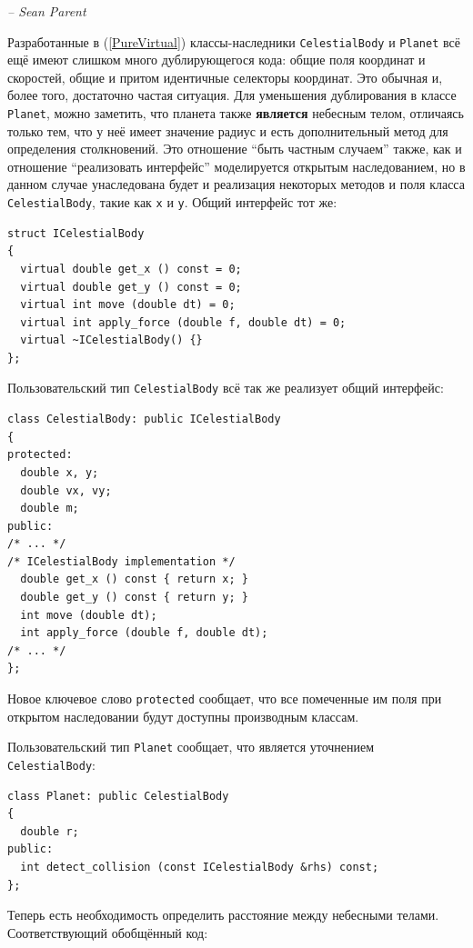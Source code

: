 \documentclass[a4paper,12pt,oneside]{article}
\begin{document}
\hfill\textit{-- Sean Parent}

Разработанные в (\ref{PureVirtual}) классы-наследники \lstinline!CelestialBody! и \lstinline!Planet! всё ещё имеют слишком много дублирующегося кода: общие поля координат и скоростей, общие и притом идентичные селекторы координат. Это обычная и, более того, достаточно частая ситуация. Для уменьшения дублирования в классе \lstinline!Planet!, можно заметить, что планета также \textbf{является} небесным телом, отличаясь только тем, что у неё имеет значение радиус и есть дополнительный метод для определения столкновений. Это отношение ``быть частным случаем'' также, как и отношение ``реализовать интерфейс'' моделируется открытым наследованием, но в данном случае унаследована будет и реализация некоторых методов и поля класса \lstinline!CelestialBody!, такие как \lstinline!x! и \lstinline!y!. Общий интерфейс тот же:

\begin{lstlisting}
struct ICelestialBody
{
  virtual double get_x () const = 0;
  virtual double get_y () const = 0;
  virtual int move (double dt) = 0;
  virtual int apply_force (double f, double dt) = 0;
  virtual ~ICelestialBody() {}
};
\end{lstlisting}

Пользовательский тип \lstinline!CelestialBody! всё так же реализует общий интерфейс:

\begin{lstlisting}
class CelestialBody: public ICelestialBody
{
protected:
  double x, y;
  double vx, vy;
  double m;
public:
/* ... */
/* ICelestialBody implementation */
  double get_x () const { return x; }
  double get_y () const { return y; }
  int move (double dt); 
  int apply_force (double f, double dt);
/* ... */
};
\end{lstlisting}

Новое ключевое слово \lstinline!protected! сообщает, что все помеченные им поля при открытом наследовании будут доступны производным классам.

Пользовательский тип \lstinline!Planet! сообщает, что является уточнением \lstinline!CelestialBody!:

\begin{lstlisting}
class Planet: public CelestialBody
{
  double r;
public:
  int detect_collision (const ICelestialBody &rhs) const;
};
\end{lstlisting}

Теперь есть необходимость определить расстояние между небесными телами. Соответствующий обобщённый код:
\end{document}
